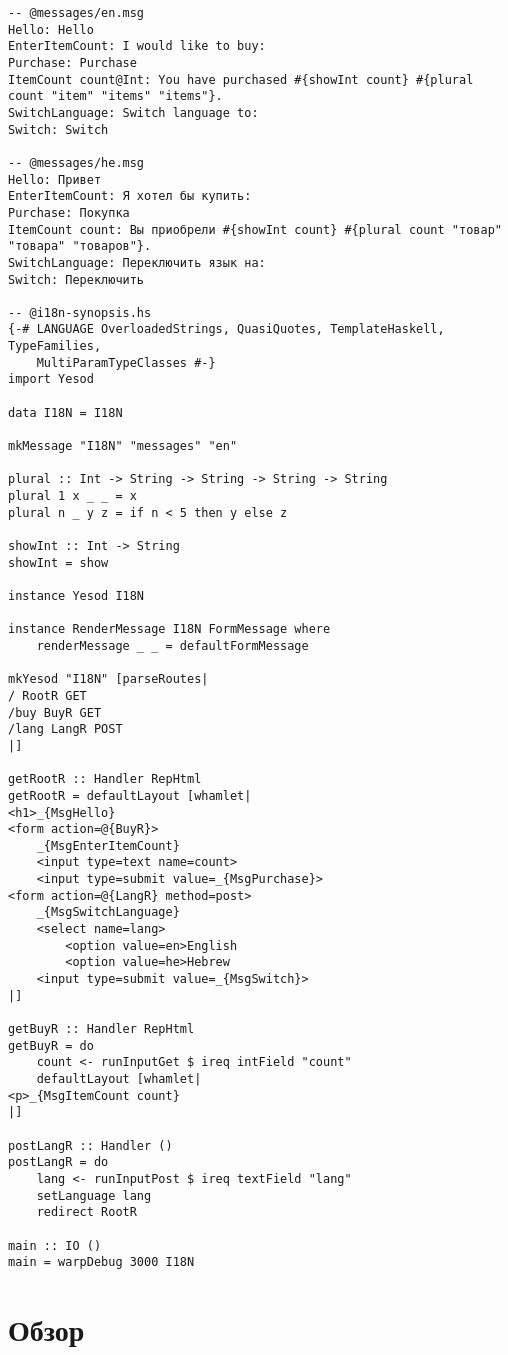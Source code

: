 \begin{lstlisting}
-- @messages/en.msg
Hello: Hello
EnterItemCount: I would like to buy: 
Purchase: Purchase
ItemCount count@Int: You have purchased #{showInt count} #{plural count "item" "items" "items"}.
SwitchLanguage: Switch language to: 
Switch: Switch

-- @messages/he.msg
Hello: Привет
EnterItemCount: Я хотел бы купить: 
Purchase: Покупка
ItemCount count: Вы приобрели #{showInt count} #{plural count "товар" "товара" "товаров"}.
SwitchLanguage: Переключить язык на:
Switch: Переключить

-- @i18n-synopsis.hs
{-# LANGUAGE OverloadedStrings, QuasiQuotes, TemplateHaskell, TypeFamilies,
    MultiParamTypeClasses #-}
import Yesod

data I18N = I18N

mkMessage "I18N" "messages" "en"

plural :: Int -> String -> String -> String -> String
plural 1 x _ _ = x
plural n _ y z = if n < 5 then y else z

showInt :: Int -> String
showInt = show

instance Yesod I18N

instance RenderMessage I18N FormMessage where
    renderMessage _ _ = defaultFormMessage

mkYesod "I18N" [parseRoutes|
/ RootR GET
/buy BuyR GET
/lang LangR POST
|]

getRootR :: Handler RepHtml
getRootR = defaultLayout [whamlet|
<h1>_{MsgHello}
<form action=@{BuyR}>
    _{MsgEnterItemCount}
    <input type=text name=count>
    <input type=submit value=_{MsgPurchase}>
<form action=@{LangR} method=post>
    _{MsgSwitchLanguage}
    <select name=lang>
        <option value=en>English
        <option value=he>Hebrew
    <input type=submit value=_{MsgSwitch}>
|]

getBuyR :: Handler RepHtml
getBuyR = do
    count <- runInputGet $ ireq intField "count"
    defaultLayout [whamlet|
<p>_{MsgItemCount count}
|]

postLangR :: Handler ()
postLangR = do
    lang <- runInputPost $ ireq textField "lang"
    setLanguage lang
    redirect RootR

main :: IO ()
main = warpDebug 3000 I18N
\end{lstlisting}

\section{Обзор} %

